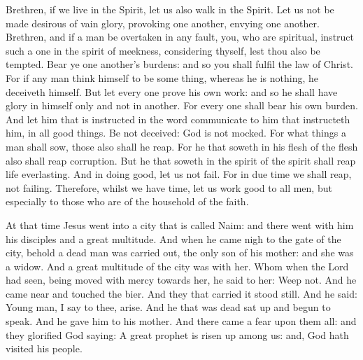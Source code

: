 \begin{multicols}{2}

Brethren, if we live in the Spirit, let us also walk in the Spirit.
Let us not be made desirous of vain glory, provoking one another,
envying one another.
Brethren, and if a man be overtaken in any fault, you, who are
spiritual, instruct such a one in the spirit of meekness, considering
thyself, lest thou also be tempted.
Bear ye one another's burdens: and so you shall fulfil the law of
Christ.
For if any man think himself to be some thing, whereas he is
nothing, he deceiveth himself.
But let every one prove his own work: and so he shall have glory in
himself only and not in another.
For every one shall bear his own burden.
And let him that is instructed in the word communicate to him that
instructeth him, in all good things.
Be not deceived: God is not mocked.
For what things a man shall sow, those also shall he reap.  For he
that soweth in his flesh of the flesh also shall reap corruption. But he
that soweth in the spirit of the spirit shall reap life everlasting.
And in doing good, let us not fail. For in due time we shall reap,
not failing.
Therefore, whilst we have time, let us work good to all men, but
especially to those who are of the household of the faith.



At that time Jesus went into a city that is
called Naim: and there went with him his disciples and a great
multitude.
And when he came nigh to the gate of the city, behold a dead man
was carried out, the only son of his mother: and she was a widow. And a
great multitude of the city was with her.
Whom when the Lord had seen, being moved with mercy towards her,
he said to her: Weep not.
And he came near and touched the bier. And they that carried it
stood still. And he said: Young man, I say to thee, arise.
And he that was dead sat up and begun to speak. And he gave him to
his mother.
And there came a fear upon them all: and they glorified God
saying: A great prophet is risen up among us: and, God hath visited his
people.


\bigskip





\end{multicols}
